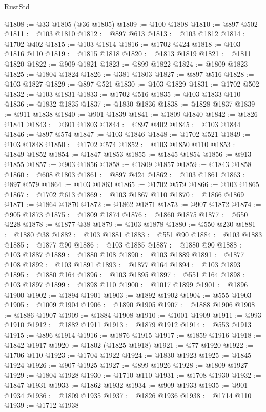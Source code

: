 \begin{lexlean}{RustStd}
\begin{coremodule}
@1808 := @33 @1805 (@36 @1805)
@1809 := @100 @1808
@1810 := @897 @502
@1811 := @103 @1810
@1812 := @897 @613
@1813 := @103 @1812
@1814 := @1702 @402
@1815 := @103 @1814
@1816 := @1702 @424
@1818 := @103 @1816 @110
@1819 := @1815 @1818
@1820 := @1813 @1819
@1821 := @1811 @1820
@1822 := @909 @1821
@1823 := @899 @1822
@1824 := @1809 @1823
@1825 := @1804 @1824
@1826 := @381 @1803
@1827 := @897 @516
@1828 := @103 @1827
@1829 := @897 @521
@1830 := @103 @1829
@1831 := @1702 @502
@1832 := @103 @1831
@1833 := @1702 @516
@1835 := @103 @1833 @110
@1836 := @1832 @1835
@1837 := @1830 @1836
@1838 := @1828 @1837
@1839 := @911 @1838
@1840 := @901 @1839
@1841 := @1809 @1840
@1842 := @1826 @1841
@1843 := @601 @1803
@1844 := @897 @402
@1845 := @103 @1844
@1846 := @897 @574
@1847 := @103 @1846
@1848 := @1702 @521
@1849 := @103 @1848
@1850 := @1702 @574
@1852 := @103 @1850 @110
@1853 := @1849 @1852
@1854 := @1847 @1853
@1855 := @1845 @1854
@1856 := @913 @1855
@1857 := @903 @1856
@1858 := @1809 @1857
@1859 := @1843 @1858
@1860 := @608 @1803
@1861 := @897 @424
@1862 := @103 @1861
@1863 := @897 @579
@1864 := @103 @1863
@1865 := @1702 @579
@1866 := @103 @1865
@1867 := @1702 @613
@1869 := @103 @1867 @110
@1870 := @1866 @1869
@1871 := @1864 @1870
@1872 := @1862 @1871
@1873 := @907 @1872
@1874 := @905 @1873
@1875 := @1809 @1874
@1876 := @1860 @1875
@1877 := @550 @228
@1878 := @1877 @38
@1879 := @103 @1878
@1880 := @550 @230
@1881 := @1880 @38
@1882 := @103 @1881
@1883 := @551 @90
@1884 := @103 @1883
@1885 := @1877 @90
@1886 := @103 @1885
@1887 := @1880 @90
@1888 := @103 @1887
@1889 := @1880 @108
@1890 := @103 @1889
@1891 := @1877 @108
@1892 := @103 @1891
@1893 := @1877 @164
@1894 := @103 @1893
@1895 := @1880 @164
@1896 := @103 @1895
@1897 := @551 @164
@1898 := @103 @1897
@1899 := @1898 @110
@1900 := @1017 @1899
@1901 := @1896 @1900
@1902 := @1894 @1901
@1903 := @1892 @1902
@1904 := @555 @1903
@1905 := @1009 @1904
@1906 := @1890 @1905
@1907 := @1888 @1906
@1908 := @1886 @1907
@1909 := @1884 @1908
@1910 := @1001 @1909
@1911 := @993 @1910
@1912 := @1882 @1911
@1913 := @1879 @1912
@1914 := @553 @1913
@1915 := @896 @1914
@1916 := @1876 @1915
@1917 := @1859 @1916
@1918 := @1842 @1917
@1920 := @1802 (@1825 @1918)
@1921 := @77 @1920
@1922 := @1706 @110
@1923 := @1704 @1922
@1924 := @1830 @1923
@1925 := @1845 @1924
@1926 := @907 @1925
@1927 := @899 @1926
@1928 := @1809 @1927
@1929 := @1804 @1928
@1930 := @1710 @110
@1931 := @1708 @1930
@1932 := @1847 @1931
@1933 := @1862 @1932
@1934 := @909 @1933
@1935 := @901 @1934
@1936 := @1809 @1935
@1937 := @1826 @1936
@1938 := @1714 @110
@1939 := @1712 @1938

\end{coremodule}
\end{lexlean}
